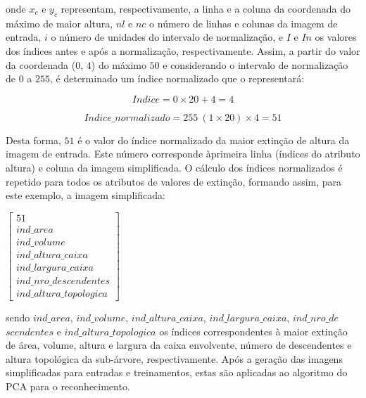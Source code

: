 onde $x_{c}$ e $y_{c}$ representam, respectivamente, a linha e a coluna da coordenada do m{\'a}ximo de maior altura, $nl$ e $nc$ o n{\'u}mero de linhas e colunas da imagem de entrada, $i$ o n{\'u}mero de unidades do intervalo de normaliza{\c c}{\~a}o, e $I$ e $In$ os valores dos {\'i}ndices antes e ap{\'o}s a normaliza{\c c}{\~a}o, respectivamente. Assim, a partir do valor da coordenada ($0$, $4$) do m{\'a}ximo $50$ e considerando o intervalo de normaliza{\c c}{\~a}o de $0$ a $255$, {\'e} determinado um {\'i}ndice normalizado que o representar{\'a}:

\begin{equation}
	Indice = 0 \times 20 + 4 = 4
\end{equation}

\begin{equation}
	Indice\_normalizado = 255 \ (1 \times 20) \times 4 = 51
\end{equation}

Desta forma, $51$ {\'e} o valor do {\'i}ndice normalizado da maior extin{\c c}{\~a}o de altura da imagem de entrada. Este n{\'u}mero corresponde {\`a}primeira linha ({\'i}ndices do atributo altura) e coluna da imagem simplificada. O c{\'a}lculo dos {\'i}ndices normalizados {\'e} repetido para todos os atributos de valores de extin{\c c}{\~a}o, formando assim, para este exemplo, a imagem simplificada:

\begin{center}
$\left[
	\begin{array}{c}
		51 \\
		ind\_area \\
		ind\_volume \\
		ind\_altura\_caixa \\
		ind\_largura\_caixa \\
		ind\_nro\_descendentes \\
		ind\_altura\_topologica 
	\end{array} 
\right]$
\end{center}

sendo $ind\_area$, $ind\_volume$, $ind\_altura\_caixa$, $ind\_largura\_caixa$, $ind\_nro\_de$ $scendentes$ e $ind\_altura\_topologica$ os {\'i}ndices correspondentes {\`a} maior extin{\c c}{\~a}o de {\'a}rea, volume, altura e largura da caixa envolvente, n{\'u}mero de descendentes e altura topol{\'o}gica da sub-{\'a}rvore, respectivamente. Ap{\'o}s a gera{\c c}{\~a}o das imagens simplificadas para entradas e treinamentos, estas s{\~a}o aplicadas ao algoritmo do PCA para o reconhecimento.
